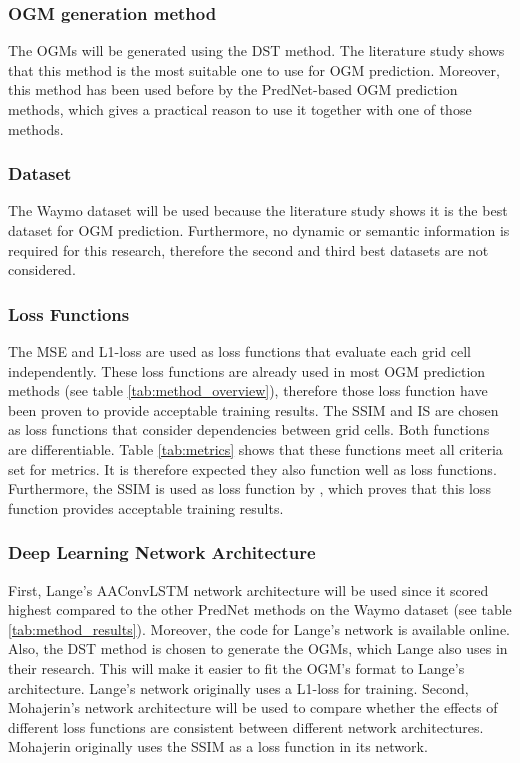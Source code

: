 \subsubsection{\gls{OGM} generation method} 
The \glspl{OGM} will be generated using the \gls{DST} method. The literature study shows that this method is the most suitable one to use for \gls{OGM} prediction. Moreover, this method has been used before by the PredNet-based \gls{OGM} prediction methods, which gives a practical reason to use it together with one of those methods.  

\subsubsection{Dataset} 
The Waymo \cite{sun2020scalability} dataset will be used because the literature study shows it is the best dataset for \gls{OGM} prediction. Furthermore, no dynamic or semantic information is required for this research, therefore the second and third best datasets are not considered. 

\subsubsection{Loss Functions}
The \gls{MSE} and L1-loss are used as loss functions that evaluate each grid cell independently. These loss functions are already used in most \gls{OGM} prediction methods (see table \ref{tab:method_overview}), therefore those loss function have been proven to provide acceptable training results. The \gls{SSIM} and \gls{IS} are chosen as loss functions that consider dependencies between grid cells. Both functions are differentiable. Table \ref{tab:metrics} shows that these functions meet all criteria set for metrics. It is therefore expected they also function well as loss functions. Furthermore, the \gls{SSIM} is used as loss function by \cite{mohajerin2019multi}, which proves that this loss function provides acceptable training results.

\subsubsection{Deep Learning Network Architecture} 
First, Lange's \cite{lange2020attention} \gls{AAConvLSTM} network architecture will be used since it scored highest compared to the other PredNet methods on the Waymo \cite{sun2020scalability} dataset (see table \ref{tab:method_results}). Moreover, the code for Lange's \cite{lange2020attention} network is available online. Also, the \gls{DST} method is chosen to generate the \glspl{OGM}, which Lange also uses in their research. This will make it easier to fit the \gls{OGM}'s format to Lange's architecture. Lange's network originally uses a L1-loss for training. 
Second, Mohajerin's \cite{mohajerin2019multi} network architecture will be used to compare whether the effects of different loss functions are consistent between different network architectures. Mohajerin \cite{mohajerin2019multi} originally uses the \gls{SSIM} as a loss function in its network.

